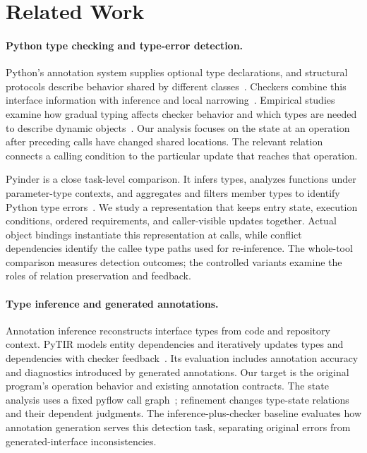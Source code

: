 \section{Related Work}
\label{sec:relatedwork}
\paragraph{Python type checking and type-error detection.}
Python's annotation system supplies optional type declarations, and
structural protocols describe behavior shared by different
classes~\cite{pep484,pep544}. Checkers combine this interface information
with inference and local narrowing~\cite{mypyTypeNarrowing,pythonTypeNarrowing}.
Empirical studies examine how gradual typing affects checker behavior
and which types are needed to describe dynamic
objects~\cite{xu2023gradual,sun2023dynamicObjects}. Our analysis focuses
on the state at an operation after preceding calls have changed shared
locations. The relevant relation connects a calling condition to the
particular update that reaches that operation.

Pyinder is a close task-level comparison. It infers types, analyzes
functions under parameter-type contexts, and aggregates and filters member
types to identify Python type errors~\cite{oh2024pyinder}. We study a
representation that keeps entry state, execution conditions, ordered
requirements, and caller-visible updates together. Actual object bindings
instantiate this representation at calls, while conflict dependencies
identify the callee type paths used for re-inference. The whole-tool
comparison measures detection outcomes; the controlled variants examine
the roles of relation preservation and feedback.

\paragraph{Type inference and generated annotations.}
Annotation inference reconstructs interface types from code and repository
context. PyTIR models entity dependencies and iteratively updates types
and dependencies with checker feedback~\cite{sun2025pytir}. Its evaluation
includes annotation accuracy and diagnostics introduced by generated
annotations. Our target is the original program's operation behavior and
existing annotation contracts. The state analysis uses a fixed pyflow
call graph~\cite{pyflow2026}; refinement changes type-state relations and
their dependent judgments. The inference-plus-checker baseline evaluates
how annotation generation serves this detection task, separating original
errors from generated-interface inconsistencies.

